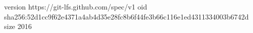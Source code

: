 version https://git-lfs.github.com/spec/v1
oid sha256:52d1cc9f62e4371a4ab4d35e28fc8b6f44fe3b66c116e1ed4311334003b6742d
size 2016
